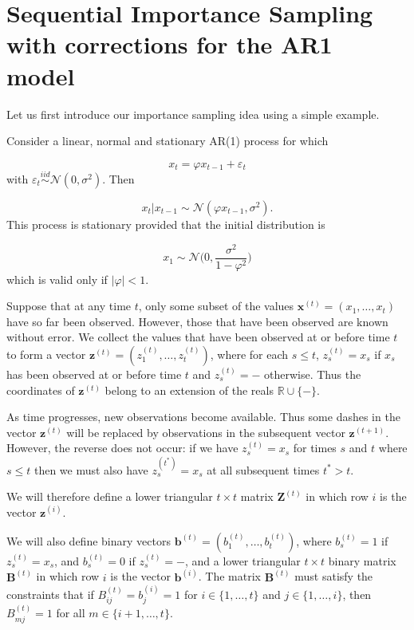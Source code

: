 \documentclass[11pt,a4paper]{article}
\newcommand{\eps}{\varepsilon}
\renewcommand{\vec}[1]{\mathbf{#1}}
\begin{document}
\section{Sequential Importance Sampling with corrections for the AR1 model}

Let us first introduce our importance sampling idea using a simple example.

Consider a linear, normal and stationary AR(1) process for which

\[
x_{t} = \varphi x_{t-1} + \eps_{t}
\]
with $\eps_{t} \stackrel{iid}{\sim} \mathcal{N}(0, \sigma^{2})$.
Then

\[
x_{t} | x_{t-1} \sim \mathcal{N} (\varphi x_{t-1}, \sigma^{2}).
\]
This process is stationary provided that the initial distribution is

\[
x_{1} \sim \mathcal{N} \Bigg (0, \frac{\sigma^2}{1- \varphi^2} \Bigg )
\]
which is valid only if $|\varphi| < 1$.

Suppose that at any time $t$, only some subset of the values $\vec {x}^{(t)} = (x_1, \dots, x_{t})$ have so far been observed. However, those that have been observed are known without error. We collect the values that have been observed at or before time $t$ to form a vector $\vec{z}^{(t)} = (z_1^{(t)}, \dots, z_{t}^{(t)})$, where for each $s \leq t$, $z_s^{(t)} = x_s$ if $x_s$ has been observed at or before time $t$ and $z_s^{(t)} = -$ otherwise. Thus the coordinates of $\vec{z}^{(t)}$ belong to an extension of the reals $\mathbb{R} \cup \{ - \}$.

As time progresses, new observations become available. Thus some dashes in the vector $\vec{z}^{(t)}$ will be replaced by observations in the subsequent vector $\vec{z}^{(t+1)}$. However, the reverse does not occur: if we have $z_s^{(t)} = x_s$ for times $s$ and $t$ where $s \leq t$ then we must also have $z_s^{(t^{*})} = x_s$ at all subsequent times $t^{*} > t$.

We will therefore define a lower triangular $t \times t$ matrix $\vec{Z}^{(t)}$ in which row $i$ is the vector $\vec{z}^{(i)}$.

We will also define binary vectors $\vec{b}^{(t)} = (b_1^{(t)}, \dots, b_{t}^{(t)})$, where $b_s^{(t)} = 1$ if $z_s^{(t)} = x_s$, and $b_s^{(t)} = 0$ if $z_s^{(t)} = -$, and a lower triangular $t \times t$ binary matrix $\vec{B}^{(t)}$ in which row $i$ is the vector $\vec{b}^{(i)}$.
The matrix $\vec{B}^{(t)}$ must satisfy the constraints that if $B_{ij}^{(t)} = b_j^{(i)} = 1$ for $i \in \{ 1, \ldots, t \}$ and $j \in \{ 1, \ldots, i \}$, then $B_{mj}^{(t)} = 1$ for all $m \in \{ i+1, \ldots, t \}$.
\end{document}
